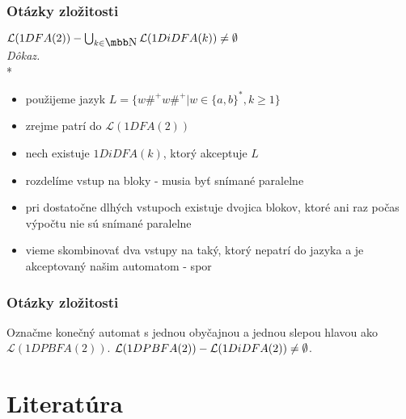 \documentclass[slovak]{beamer}
\begin{document}
\begin{comment}
\begin{frame}
\frametitle{Otázky zložitosti}
\begin{itemize}
\item slová z $L_{h}$ rozdelíme do tried podľa stavu, v ktorom sa automat nachádza pri začatí čítania bloku $x_{t'}$
\item jazyk je "hustý", veľa slov v jednej triede, vieme zmiešať dva vstupy na taký, ktorý nepatrí do jazyka
\end{itemize}
Pre dvojsmerné automaty by vyriešenie tejto otázky dalo odpoveď na vzťah tried $\textbf{NC} ^{1}$ a $\textbf{L}$ (resp. $\textbf{NL}$).
\end{frame}
\end{comment}

\begin{frame}
\frametitle{Otázky zložitosti}
\cveta
$\mathcal{L} (1DFA(2)) - \bigcup_{k \in \N } \mathcal{L} (1DiDFA(k)) \neq \emptyset$ \\
\emph{Dôkaz.} \\*
\begin{itemize}
\item použijeme jazyk $L = \{ w\#^{+}w\#^{+} | w \in \{ a, b \}^{*}, k \geq 1 \}$
\item zrejme patrí do $\mathcal{L} (1DFA(2))$
\item nech existuje $1DiDFA(k)$, ktorý akceptuje $L$
\item rozdelíme vstup na bloky - musia byť snímané paralelne
\item pri dostatočne dlhých vstupoch existuje dvojica blokov, ktoré ani raz počas výpočtu nie sú snímané paralelne
\item vieme skombinovať dva vstupy na taký, ktorý nepatrí do jazyka a je akceptovaný našim automatom - spor
\end{itemize}
\end{frame}

\begin{frame}
\frametitle{Otázky zložitosti}
Označme konečný automat s jednou obyčajnou a jednou slepou hlavou ako $\mathcal{L} (1DPBFA(2))$.
\cveta
$\mathcal{L} (1DPBFA(2)) - \mathcal{L} (1DiDFA(2)) \neq \es$.
\end{frame}

\section*{Literatúra}
\end{document}
